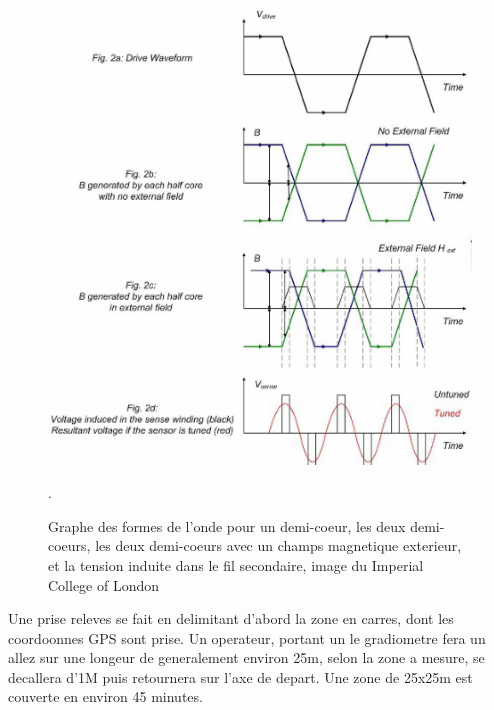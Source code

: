 \documentclass[a4paper, 12pt, titlepage, oneside, french]{article}
\begin{document}
\begin{figure}[H]
	\centering
		\includegraphics[width=\textwidth, height=0.9\textheight, keepaspectratio]{FluxgatePlot.jpg}
		\caption{Graphe des formes de l'onde pour un demi-coeur, les deux demi-coeurs, les deux demi-coeurs avec un champs magnetique exterieur, et la tension induite dans le fil secondaire, image du Imperial College of London}. 
		\label{fig:FluxPlot}
\end{figure}

		Une prise releves se fait en delimitant d'abord la zone en carres, dont les coordoonnes GPS sont prise. Un operateur, portant un le gradiometre fera un allez sur une longeur de generalement environ 25m, selon la zone a mesure, se decallera d'1M puis retournera sur l'axe de depart. Une zone de 25x25m est couverte en environ 45 minutes.
\end{document}
